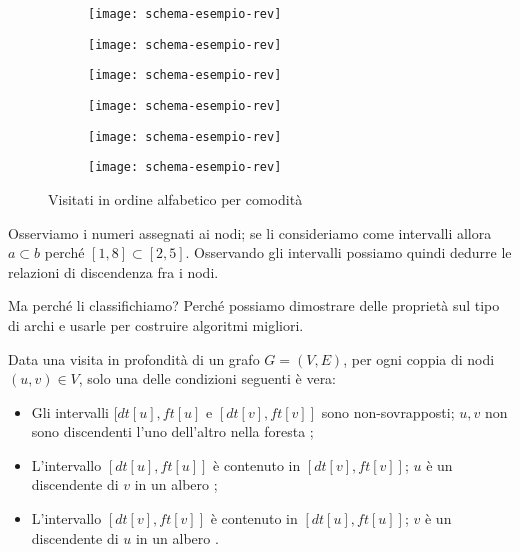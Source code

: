 \begin{figure}[H]
	\begin{subfigure}{.15\textwidth}
		\texttt{[image: schema-esempio-rev]}
	\end{subfigure}\hfill
	\begin{subfigure}{.15\textwidth}
		\texttt{[image: schema-esempio-rev]}
	\end{subfigure}\hfill
	\begin{subfigure}{.15\textwidth}
		\texttt{[image: schema-esempio-rev]}
	\end{subfigure}\hfill
	\begin{subfigure}{.15\textwidth}
		\texttt{[image: schema-esempio-rev]}
	\end{subfigure}\hfill
	\begin{subfigure}{.15\textwidth}
		\texttt{[image: schema-esempio-rev]}
	\end{subfigure}\hfill
	\begin{subfigure}{.15\textwidth}
		\texttt{[image: schema-esempio-rev]}
	\end{subfigure}

	\caption[]{Visitati in ordine alfabetico per comodità}
\end{figure}

Osserviamo i numeri assegnati ai nodi; se li consideriamo come intervalli allora \(a \subset b\) perché \([1,8] \subset [2,5]\).
Osservando gli intervalli possiamo quindi dedurre le relazioni di discendenza fra i nodi.

Ma perché li classifichiamo?
Perché possiamo dimostrare delle proprietà sul tipo di archi e usarle per costruire algoritmi migliori.

\begin{theorem*}
Data una visita in profondità di un grafo \(G = (V, E)\), per ogni coppia di nodi \((u, v) \in V\), solo una delle condizioni seguenti è vera:
\begin{itemize}
	\item Gli intervalli \([dt[u], ft[u]\) e \([dt[v], ft[v]]\) sono non-sovrapposti;
	\(u,v\) non sono discendenti l'uno dell'altro nella foresta ;
	\item L'intervallo \([dt[u], ft[u]]\) è contenuto in \([dt[v], ft[v]]\);
	\(u\) è un discendente di \(v\) in un albero ;
	\item L'intervallo \([dt[v], ft[v]]\) è contenuto in \([dt[u], ft[u]]\);
	\(v\) è un discendente di \(u\) in un albero .
\end{itemize}
\end{theorem*}

